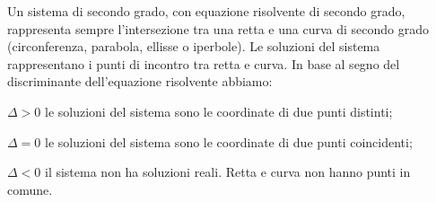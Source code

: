\conclusione
Un sistema di secondo grado, con equazione risolvente di secondo grado, 
rappresenta sempre l'intersezione tra una retta e una curva di secondo grado 
(circonferenza, parabola, ellisse o iperbole). Le soluzioni del sistema 
rappresentano i punti di incontro tra retta e curva. In base al segno del 
discriminante dell'equazione risolvente abbiamo:
\begin{itemize*}
\item \(\Delta >0\) le soluzioni del sistema sono le coordinate di due punti 
distinti;
\item \(\Delta =0\) le soluzioni del sistema sono le coordinate di due punti 
coincidenti;
\item \(\Delta <0\) il sistema non ha soluzioni reali. Retta e curva non hanno 
punti in comune.
\end{itemize*}
\begin{center}

\end{center}

